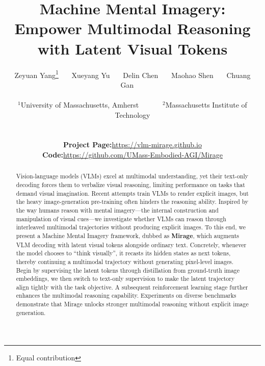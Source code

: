 \documentclass{article}
\title{Machine Mental Imagery: Empower Multimodal Reasoning with Latent Visual Tokens}
\author{
Zeyuan Yang\affmark[1]\thanks{Equal contribution}~~~ 
Xueyang Yu\affmark[1]\footnotemark[1]~~~
Delin Chen\affmark[1]~~~
Maohao Shen\affmark[2]~~~
Chuang Gan\affmark[1]~~~
\\ \\
$^1$University of Massachusetts, Amherst~~~~~~
$^2$Massachusetts Institute of Technology \\ \\
\begin{tabular}{@{}ll@{}}
\textbf{Project Page:} & \url{https://vlm-mirage.github.io} \\
\textbf{Code:} & \url{https://github.com/UMass-Embodied-AGI/Mirage} \\
\end{tabular}
}
\newcommand{\Model}{Mirage\xspace}
\begin{document}
\maketitle


\begin{abstract}
Vision-language models (VLMs) excel at multimodal understanding, yet their text-only decoding forces them to verbalize visual reasoning, limiting performance on tasks that demand visual imagination.
Recent attempts train VLMs to render explicit images, but the heavy image-generation pre-training often hinders the reasoning ability.
Inspired by the way humans reason with mental imagery—the internal construction and manipulation of visual cues—we investigate whether VLMs can reason through interleaved multimodal trajectories without producing explicit images.
To this end, we present a Machine Mental Imagery framework, dubbed as \textbf{\Model}, which augments VLM decoding with latent visual tokens alongside ordinary text.
Concretely, whenever the model chooses to ``think visually'', it recasts its hidden states as next tokens, thereby continuing a multimodal trajectory without generating pixel-level images.
Begin by supervising the latent tokens through distillation from ground-truth image embeddings, we then switch to text-only supervision to make the latent trajectory align tightly with the task objective. A subsequent reinforcement learning stage further enhances the multimodal reasoning capability.
Experiments on diverse benchmarks demonstrate that \Model unlocks stronger multimodal reasoning without explicit image generation. 
\end{abstract}











\clearpage
{
    \small
    
    
}

\clearpage

\end{document}
